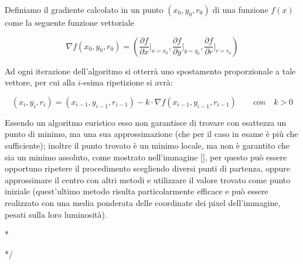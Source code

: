 \documentclass[12pt]{article}
\newenvironment{changemargin}[2]{%
    \begin{list}{}{%
    \setlength{\topsep}{0pt}%
    \setlength{\leftmargin}{#1}%
    \setlength{\rightmargin}{#2}%
    \setlength{\listparindent}{\parindent}%
    \setlength{\itemindent}{\parindent}%
    \setlength{\parsep}{\parskip}%
    }%
    \item[]}{\end{list}}
\begin{document}
        
        Definiamo il gradiente calcolato in un punto $(x_0, y_0, r_0)$ di una funzione $f(x)$ come la seguente funzione vettoriale
        
        \begin{equation}
            \nabla f (x_0, y_0, r_0) = \left( \frac{\partial f}{\partial x} \bigg\rvert_{x = x_0}, \frac{\partial f}{\partial y} \bigg\rvert_{y = y_0}, \frac{\partial f}{\partial r} \bigg\rvert_{r = r_0} \right)
        \end{equation}
        
        
        Ad ogni iterazione dell'algoritmo si otterrà uno spostamento proporzionale a tale vettore, per cui alla $i$-esima ripetizione si avrà:
         
        \begin{equation}
            (x_i, y_i, r_i) = (x_{i-1}, y_{i-1}, r_{i-1}) - k \cdot \nabla f (x_{i-1}, y_{i-1}, r_{i-1}) \qquad con \quad k > 0
        \end{equation}
        
        Essendo un algoritmo euristico esso non garantisce di trovare con esattezza un punto di minimo, ma una sua approssimazione (che per il caso in esame è più che sufficiente); inoltre il punto trovato è un minimo locale, ma non è garantito che sia un minimo assoluto, come mostrato nell'immagine \ref{}, per questo può essere opportuno ripetere il procedimento scegliendo diversi punti di partenza, oppure approssimare il centro con altri metodi e utilizzare il valore trovato come punto iniziale (quest'ultimo metodo risulta particolarmente efficace e può essere realizzato con una media ponderata delle coordinate dei pixel dell'immagine, pesati sulla loro luminosità).


\/*
    \begin{changemargin}{-1cm}{-1cm}

    
    \end{changemargin}
*/    
  
   
    \vfill
    \let\thefootnote\relax{}
\end{document}

